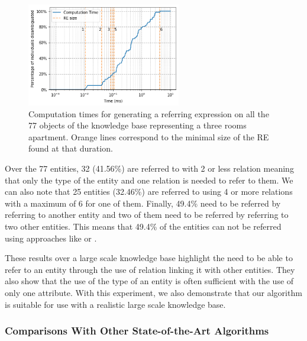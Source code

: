 \documentclass[a4paper,11pt,twoside]{StyleThese}
\begin{document}
\begin{figure}[hbtp]
\centering
\includegraphics[width=0.6\textwidth]{figures/chapter3/scalingupREG.png}
\caption{Computation times for generating a referring expression on all the 77 objects of the knowledge base representing a three rooms apartment. Orange lines correspond to the minimal size of the RE found at that duration.}
\label{fig:scalingup}
\end{figure}

Over the 77 entities, 32 (41.56\%) are referred to with 2 or less relation meaning that only the type of the entity and one relation is needed to refer to them. We can also note that 25 entities (32.46\%) are referred to using 4 or more relations with a maximum of 6 for one of them. Finally, 49.4\% need to be referred by referring to another entity and two of them need to be referred by referring to two other entities. This means that 49.4\% of the entities can not be referred using approaches like \cite{ros2010one} or \cite{dale1995computational}.

These results over a large scale knowledge base highlight the need to be able to refer to an entity through the use of relation linking it with other entities. They also show that the use of the type of an entity is often sufficient with the use of only one attribute. With this experiment, we also demonstrate that our algorithm is suitable for use with a realistic large scale knowledge base.

\subsubsection{Comparisons With Other State-of-the-Art Algorithms}
\label{subsubsec:REGcomparisons}
\end{document}
